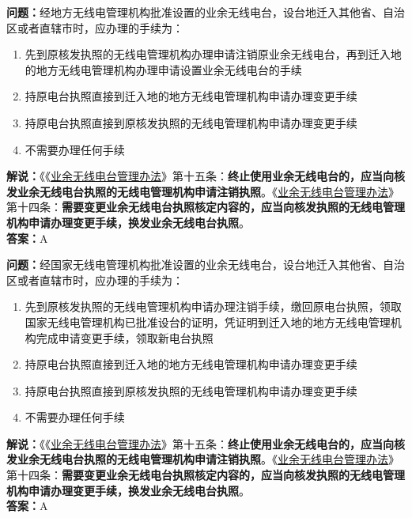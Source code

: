 \textbf{问题：}经地方无线电管理机构批准设置的业余无线电台，设台地迁入其他省、自治区或者直辖市时，应办理的手续为：
\begin{enumerate}[label=\Alph*), leftmargin=1.5cm]
	\item 先到原核发执照的无线电管理机构办理申请注销原业余无线电台，再到迁入地的地方无线电管理机构办理申请设置业余无线电台的手续
	\item 持原电台执照直接到迁入地的地方无线电管理机构申请办理变更手续
	\item 持原电台执照直接到原核发执照的无线电管理机构申请办理变更手续
	\item 不需要办理任何手续
\end{enumerate}
\textbf{解说：}《《\href{https://www.miit.gov.cn/jgsj/zfs/bmgz/art/2020/art_147b69815b3641caad9047735f94c860.html}{业余无线电台管理办法}》第十五条：\textbf{终止使用业余无线电台的，应当向核发业余无线电台执照的无线电管理机构申请注销执照}。《\href{https://www.miit.gov.cn/jgsj/zfs/bmgz/art/2020/art_147b69815b3641caad9047735f94c860.html}{业余无线电台管理办法}》第十四条：\textbf{需要变更业余无线电台执照核定内容的，应当向核发执照的无线电管理机构申请办理变更手续，换发业余无线电台执照}。\\\textbf{答案：}A%

\textbf{问题：}经国家无线电管理机构批准设置的业余无线电台，设台地迁入其他省、自治区或者直辖市时，应办理的手续为：
\begin{enumerate}[label=\Alph*), leftmargin=1.5cm]
	\item 先到原核发执照的无线电管理机构申请办理注销手续，缴回原电台执照，领取国家无线电管理机构已批准设台的证明，凭证明到迁入地的地方无线电管理机构完成申请变更手续，领取新电台执照
	\item 持原电台执照直接到迁入地的地方无线电管理机构申请办理变更手续
	\item 持原电台执照直接到原核发执照的无线电管理机构申请办理变更手续
	\item 不需要办理任何手续
\end{enumerate}
\textbf{解说：}《《\href{https://www.miit.gov.cn/jgsj/zfs/bmgz/art/2020/art_147b69815b3641caad9047735f94c860.html}{业余无线电台管理办法}》第十五条：\textbf{终止使用业余无线电台的，应当向核发业余无线电台执照的无线电管理机构申请注销执照}。《\href{https://www.miit.gov.cn/jgsj/zfs/bmgz/art/2020/art_147b69815b3641caad9047735f94c860.html}{业余无线电台管理办法}》第十四条：\textbf{需要变更业余无线电台执照核定内容的，应当向核发执照的无线电管理机构申请办理变更手续，换发业余无线电台执照}。\\\textbf{答案：}A%


